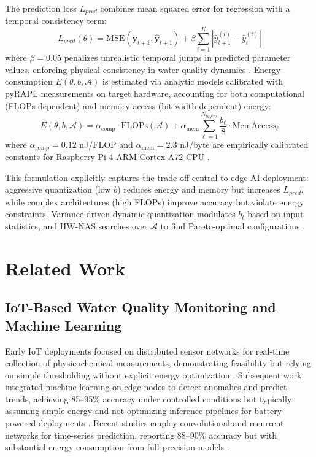\documentclass[12pt,a4paper]{article}
\begin{document}
The prediction loss $L_{pred}$ combines mean squared error for regression with a temporal consistency term:
\begin{equation}
\label{eq:prediction_loss}
L_{pred}(\theta) = \text{MSE}(\mathbf{y}_{t+1}, \hat{\mathbf{y}}_{t+1}) + \beta \sum_{i=1}^{K} |\hat{y}_{t+1}^{(i)} - \hat{y}_t^{(i)}|
\end{equation}
where $\beta=0.05$ penalizes unrealistic temporal jumps in predicted parameter values, enforcing physical consistency in water quality dynamics \citep{lin2021tcan, campos2026automl}. Energy consumption $E(\theta, b, \mathcal{A})$ is estimated via analytic models calibrated with pyRAPL measurements on target hardware, accounting for both computational (FLOPs-dependent) and memory access (bit-width-dependent) energy:
\begin{equation}
\label{eq:energy_model}
E(\theta, b, \mathcal{A}) = \alpha_{\text{comp}} \cdot \text{FLOPs}(\mathcal{A}) + \alpha_{\text{mem}} \sum_{\ell=1}^{N_{layers}} \frac{b_\ell}{8} \cdot \text{MemAccess}_\ell
\end{equation}
where $\alpha_{\text{comp}}=0.12$ nJ/FLOP and $\alpha_{\text{mem}}=2.3$ nJ/byte are empirically calibrated constants for Raspberry Pi 4 ARM Cortex-A72 CPU \citep{wandb2025qat, sinha2024hwevnas}.

This formulation explicitly captures the trade-off central to edge AI deployment: aggressive quantization (low $b$) reduces energy and memory but increases $L_{pred}$, while complex architectures (high FLOPs) improve accuracy but violate energy constraints. Variance-driven dynamic quantization modulates $b_t$ based on input statistics, and HW-NAS searches over $\mathcal{A}$ to find Pareto-optimal configurations \citep{motetti2024joint, chitty2022hwnas}.

\section{Related Work}

\subsection{IoT-Based Water Quality Monitoring and Machine Learning}

Early IoT deployments focused on distributed sensor networks for real-time collection of physicochemical measurements, demonstrating feasibility but relying on simple thresholding without explicit energy optimization \citep{essamlali2024iotml, daigavane2017iotapprox, chapman2021waterapproxapprox}. Subsequent work integrated machine learning on edge nodes to detect anomalies and predict trends, achieving 85--95\% accuracy under controlled conditions but typically assuming ample energy and not optimizing inference pipelines for battery-powered deployments \citep{konde2020iotapprox, zheng2025crossbasin}. Recent studies employ convolutional and recurrent networks for time-series prediction, reporting 88--90\% accuracy but with substantial energy consumption from full-precision models \citep{liu2025lowbit, forhad2024iot, campos2026automl}.
\end{document}
